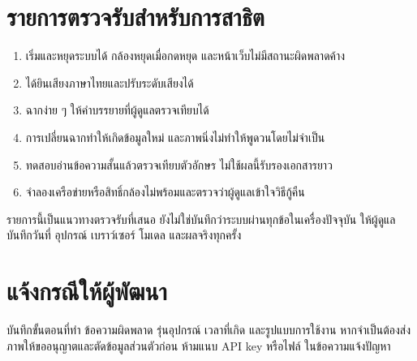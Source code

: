 \section{รายการตรวจรับสำหรับการสาธิต}
\begin{enumerate}
\item เริ่มและหยุดระบบได้ กล้องหยุดเมื่อกดหยุด และหน้าเว็บไม่มีสถานะผิดพลาดค้าง
\item ได้ยินเสียงภาษาไทยและปรับระดับเสียงได้
\item ฉากง่าย ๆ ให้คำบรรยายที่ผู้ดูแลตรวจเทียบได้
\item การเปลี่ยนฉากทำให้เกิดข้อมูลใหม่ และภาพนิ่งไม่ทำให้พูดวนโดยไม่จำเป็น
\item ทดสอบอ่านข้อความสั้นแล้วตรวจเทียบตัวอักษร ไม่ใช้ผลนี้รับรองเอกสารยาว
\item จำลองเครือข่ายหรือสิทธิ์กล้องไม่พร้อมและตรวจว่าผู้ดูแลเข้าใจวิธีกู้คืน
\end{enumerate}
รายการนี้เป็นแนวทางตรวจรับที่เสนอ ยังไม่ใช่บันทึกว่าระบบผ่านทุกข้อในเครื่องปัจจุบัน ให้ผู้ดูแลบันทึกวันที่ อุปกรณ์ เบราว์เซอร์ โมเดล และผลจริงทุกครั้ง

\section{แจ้งกรณีให้ผู้พัฒนา}
บันทึกขั้นตอนที่ทำ ข้อความผิดพลาด รุ่นอุปกรณ์ เวลาที่เกิด และรูปแบบการใช้งาน หากจำเป็นต้องส่งภาพให้ขออนุญาตและตัดข้อมูลส่วนตัวก่อน ห้ามแนบ API key หรือไฟล์  ในข้อความแจ้งปัญหา

